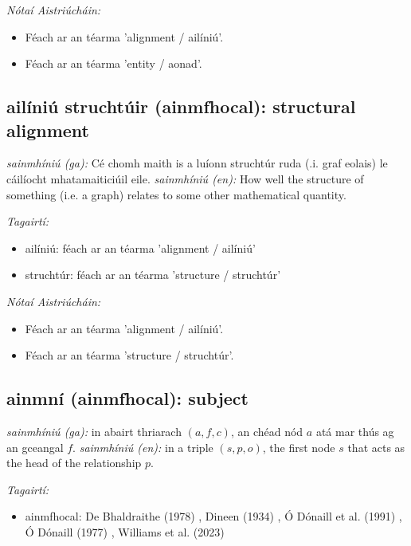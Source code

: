 \documentclass{article}
\begin{document}
 \noindent \textit{Nótaí Aistriúcháin:}
\begin{itemize}
	\item Féach ar an téarma 'alignment / ailíniú'.
	\item Féach ar an téarma 'entity / aonad'.
\end{itemize}


\subsection*{ailíniú struchtúir (ainmfhocal): structural alignment} 
 \noindent \textit{sainmhíniú (ga):} Cé chomh maith is a luíonn struchtúr ruda (.i. graf eolais) le cáilíocht mhatamaiticiúil eile.
\newline\newline
 \noindent \textit{sainmhíniú (en):} How well the structure of something (i.e. a graph) relates to some other mathematical quantity.
\newline

 \noindent \textit{Tagairtí:}
\begin{itemize}
	\item ailíniú: féach ar an téarma 'alignment / ailíniú'
	\item struchtúr: féach ar an téarma 'structure / struchtúr'
\end{itemize}

 \noindent \textit{Nótaí Aistriúcháin:}
\begin{itemize}
	\item Féach ar an téarma 'alignment / ailíniú'.
	\item Féach ar an téarma 'structure / struchtúr'.
\end{itemize}


\subsection*{ainmní (ainmfhocal): subject} 
 \noindent \textit{sainmhíniú (ga):} in abairt thriarach $(a,f,c)$, an chéad nód $a$ atá mar thús ag an gceangal $f$.
\newline\newline
 \noindent \textit{sainmhíniú (en):} in a triple $(s,p,o)$, the first node $s$ that acts as the head of the relationship $p$.
\newline

 \noindent \textit{Tagairtí:}
\begin{itemize}
	\item ainmfhocal: De Bhaldraithe (1978) \cite{de-bhaldraithe}, Dineen (1934) \cite{dineen}, Ó Dónaill et al. (1991) \cite{focloir-beag}, Ó Dónaill (1977) \cite{odonaill}, Williams et al. (2023) \cite{storchiste}
\end{itemize}
\end{document}
